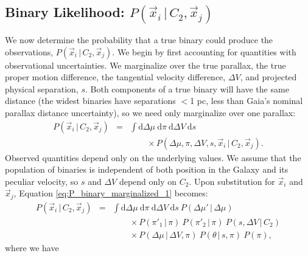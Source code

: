 \documentclass[usenatbib]{mnras}
\newcommand{\given}{\,|\,}
\newcommand{\dd}{\mathrm{d}}
\begin{document}
\begin{comment}
Combining Equation \ref{eq:P_obs_noise_split} and \ref{eq:P_noise_marginalized} gives us the following:
\begin{eqnarray}
P(\vec{x}_i \given C_1, \vec{x}_j) &=& P(\theta \given \alpha, \delta)\ 
   P(\Delta V_{\rm pec} \given \alpha, \delta, \mu_{\alpha} \mu_{\delta})\ 
   \left| \frac{\dd \Delta V_{\rm pec}}{\dd \Delta \mu} \right| \nonumber \\
   & & \qquad \times  \int \dd \Delta D'\ P(\Delta D \given \Delta D')\ P(\Delta D' \given \alpha, \delta, D),
\end{eqnarray}
where we were able to move the conditional probabilities for $\theta$ and $\Delta V_{\rm pec}$ outside the integral over $\Delta D'$ because of their independence on distance.
\end{comment}




\subsection{Binary Likelihood: $P(\vec{x}_i \given C_2, \vec{x}_j)$}

We now determine the probability that a true binary could produce the observations, $P(\vec{x}_i \given C_2, \vec{x}_j)$. We begin by first accounting for quantities with observational uncertainties. We marginalize over the true parallax, the true proper motion difference, the tangential velocity difference, $\Delta V$, and projected physical separation, $s$. Both components of a true binary will have the same distance (the widest binaries have separations $<$1 pc, less than Gaia's nominal parallax distance uncertainty), so we need only marginalize over one parallax:
\begin{eqnarray}
P(\vec{x}_i \given C_2, \vec{x}_j) &=& \int \dd \Delta \mu\ \dd \pi\ \dd \Delta V\ \dd s\ \nonumber \\
& & \qquad \times P( \Delta \mu, \pi, \Delta V, s,\vec{x}_i \given C_2, \vec{x}_j ). \label{eq:P_binary_marginalized_1}
\end{eqnarray}
Observed quantities depend only on the underlying values. We assume that the population of binaries is independent of both position in the Galaxy and its peculiar velocity, so $s$ and $\Delta V$ depend only on $C_2$. Upon substitution for $\vec{x}_i$ and $\vec{x}_j$, Equation \ref{eq:P_binary_marginalized_1} becomes:  
\begin{eqnarray}
P(\vec{x}_i \given C_2, \vec{x}_j) &=& \int \dd \Delta \mu\ \dd \pi\ \dd \Delta V\ \dd s\ P(\Delta \mu' \given \Delta \mu) \nonumber \\
& & \qquad \times P(\pi'_1 \given \pi)\ P(\pi'_2 \given \pi)\ P(s, \Delta V \given C_2) \nonumber \\
& & \qquad \times P(\Delta \mu \given \Delta V, \pi)\ P(\theta \given s, \pi)\ P(\pi), \label{eq:P_binary_marginalized_2}
\end{eqnarray}
where we have 
\end{document}
